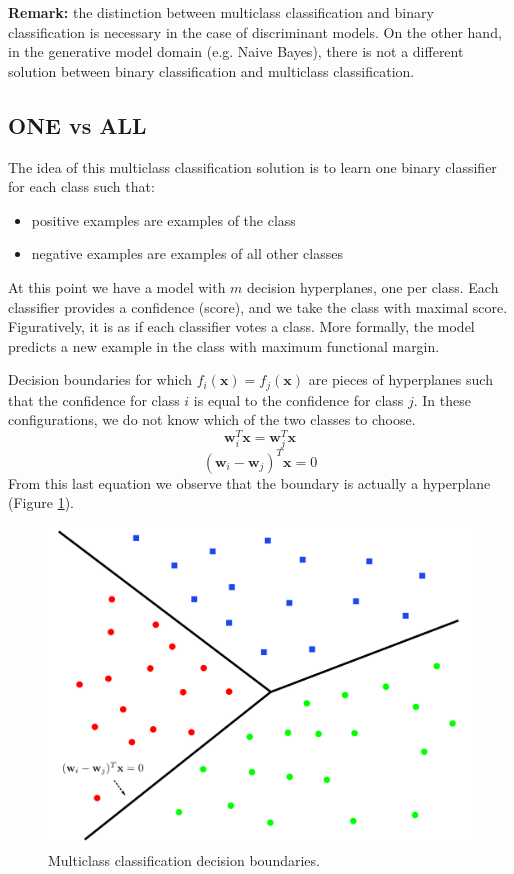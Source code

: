 \textbf{Remark:} the distinction between multiclass classification and binary classification
is necessary in the case of discriminant models. On the other hand, in the generative
model domain (e.g. Naive Bayes), there is not a different solution between binary
classification and multiclass classification.

\subsection{ONE vs ALL}
The idea of this multiclass classification solution is to learn one binary classifier
for each class such that:
\begin{itemize}
	\item positive examples are examples of the class

	\item negative examples are examples of all other classes
\end{itemize}

At this point we have a model with $m$ decision hyperplanes, one per class. Each
classifier provides a confidence (score), and we take the class with maximal
score. Figuratively, it is as if each classifier votes a class. More formally,
the model predicts a new example in the class with maximum functional margin.
\newline

Decision boundaries for which $f_{i}(\pmb{x}) = f_{j}(\pmb{x})$ are pieces of
hyperplanes such that the confidence for class $i$ is equal to the confidence
for class $j$. In these configurations, we do not know which of the two classes
to choose.
\[
	\pmb{w}_{i}^{T}\pmb{x}= \pmb{w}_{j}^{T}\pmb{x}
\]
\[
	(\pmb{w}_{i}- \pmb{w}_{j})^{T}\pmb{x}= 0
\]
From this last equation we observe that the boundary is actually a hyperplane (Figure
\ref{fig:oneVsAllMulticlassClassification}).

\begin{figure}[H]
	\centering
	\includegraphics[scale=0.3]{
		images/12_LinearDiscriminantFunctions_multiclassClassification.png
	}
	\caption{Multiclass classification decision boundaries.}
	\label{fig:oneVsAllMulticlassClassification}
\end{figure}

